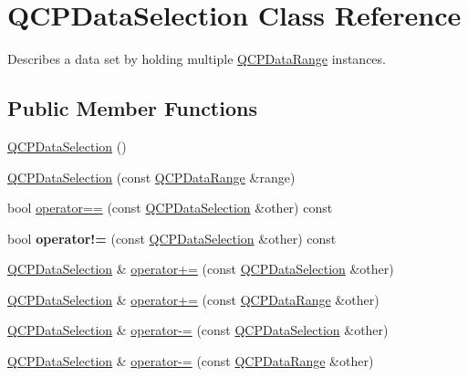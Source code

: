 \hypertarget{class_q_c_p_data_selection}{}\section{Q\+C\+P\+Data\+Selection Class Reference}
\label{class_q_c_p_data_selection}


Describes a data set by holding multiple \hyperlink{class_q_c_p_data_range}{Q\+C\+P\+Data\+Range} instances.  


\subsection*{Public Member Functions}
\begin{DoxyCompactItemize}
\item 
\hyperlink{class_q_c_p_data_selection_a0e0b7faaec7df1a7c77dd6f4883cdf0d}{Q\+C\+P\+Data\+Selection} ()
\item 
\hyperlink{class_q_c_p_data_selection_a738dfb4f5718c5df5ed35ea33ac37818}{Q\+C\+P\+Data\+Selection} (const \hyperlink{class_q_c_p_data_range}{Q\+C\+P\+Data\+Range} \&range)
\item 
bool \hyperlink{class_q_c_p_data_selection_a664fa566569b17148abafd6b1dbbf347}{operator==} (const \hyperlink{class_q_c_p_data_selection}{Q\+C\+P\+Data\+Selection} \&other) const
\item 
\mbox{\label{class_q_c_p_data_selection_a8324733cc88660ee4792ee60d6a4520c}} 
bool {\bfseries operator!=} (const \hyperlink{class_q_c_p_data_selection}{Q\+C\+P\+Data\+Selection} \&other) const
\item 
\hyperlink{class_q_c_p_data_selection}{Q\+C\+P\+Data\+Selection} \& \hyperlink{class_q_c_p_data_selection_a4584d4b0ea5c4f095bd7b70f88eb5d9d}{operator+=} (const \hyperlink{class_q_c_p_data_selection}{Q\+C\+P\+Data\+Selection} \&other)
\item 
\hyperlink{class_q_c_p_data_selection}{Q\+C\+P\+Data\+Selection} \& \hyperlink{class_q_c_p_data_selection_a17058640d4e6f49984a0e7e42043df1b}{operator+=} (const \hyperlink{class_q_c_p_data_range}{Q\+C\+P\+Data\+Range} \&other)
\item 
\hyperlink{class_q_c_p_data_selection}{Q\+C\+P\+Data\+Selection} \& \hyperlink{class_q_c_p_data_selection_a66f9fab70b026baa64bf8e52fe5de07e}{operator-\/=} (const \hyperlink{class_q_c_p_data_selection}{Q\+C\+P\+Data\+Selection} \&other)
\item 
\hyperlink{class_q_c_p_data_selection}{Q\+C\+P\+Data\+Selection} \& \hyperlink{class_q_c_p_data_selection_a8d18b20d20dde737eefc10967e31cf73}{operator-\/=} (const \hyperlink{class_q_c_p_data_range}{Q\+C\+P\+Data\+Range} \&other)

\end{DoxyCompactItemize}
